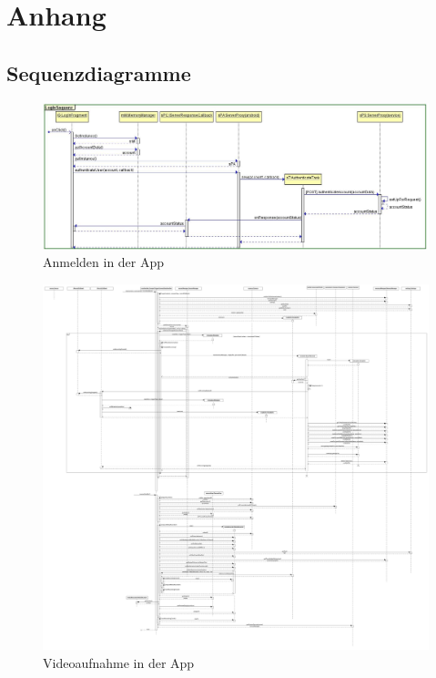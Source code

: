 \chapter{Anhang}

\section{Sequenzdiagramme}

\begin{figure}[ht]
	\centering
\includegraphics[width=1\textwidth]{./resources/Diagramme/App/logInSequence.jpg}
\caption{Anmelden in der App}
	\label{fig:AppAuth}
\end{figure}

\begin{figure}[ht]
	\centering
\includegraphics[width=1\textwidth]{./resources/Diagramme/App/recordSequence.jpg}
\caption{Videoaufnahme in der App}
	\label{fig:AppVideo}
\end{figure}

